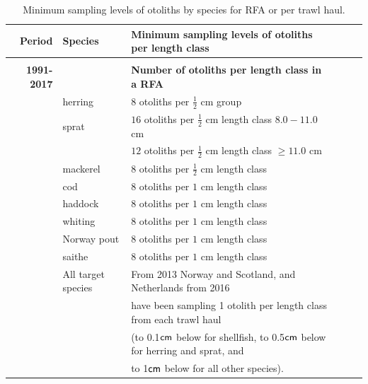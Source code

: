 \documentclass[a4paper 12pt]{article}
\numberwithin{equation}{section}
\newcommand{\cm}{\textnormal{\sffamily cm}\xspace}
\begin{document}
\begin{small}
\begin{table}[h!]
\centering
\caption{Minimum sampling levels of otoliths by species for RFA or per trawl haul.}
\label{tab:otolithsTable}
\begin{tabularx}{\linewidth}{r l l l l X}
\toprule 
Period &  Species  & Minimum sampling levels of otoliths per length class    \\[0.7ex]
\midrule \\[0.1ex]
{\bf 1991-2017} & & {\bf Number of otoliths per length class in a RFA}  \\[1.0ex]
     & herring  &  $8$  otoliths per $\frac{1}{2}$ cm group \\[0.5ex]
     & sprat    & $16$  otoliths per $\frac{1}{2}$ cm length class  $8.0 -11.0$ cm\\[0.5ex]
              & & $12$  otoliths per $\frac{1}{2}$ cm length class  $\geq 11.0$ cm\\[0.5ex]
& mackerel      & $8$  otoliths per $\frac{1}{2}$ cm length class \\[0.5ex]
& cod       	  & $8$  otoliths per $1$ cm length class\\[0.5ex]
&haddock   	  & $8$  otoliths per $1$ cm length class \\[0.5ex]
&whiting    	  & $8$  otoliths per $1$ cm length class \\[0.5ex]
&Norway pout   & $8$  otoliths per $1$ cm length class\\[0.5ex]
&saithe        & $8$  otoliths per $1$ cm length class \\[1ex] 
& All target species      &  From 2013 Norway and Scotland, and  Netherlands from 2016 \\[0.7ex] 
&& have been sampling 1 otolith per length class from each trawl haul \\[0.7ex] 
&& (to 0.1$\cm$ below for shellfish, to 0.5$\cm$ below for herring and sprat, and \\ [0.7ex] 
&& to 1$\cm$ below for all other species).\\[1.7ex] 


\end{tabularx}
\end{table}
\end{small}
\end{document}
